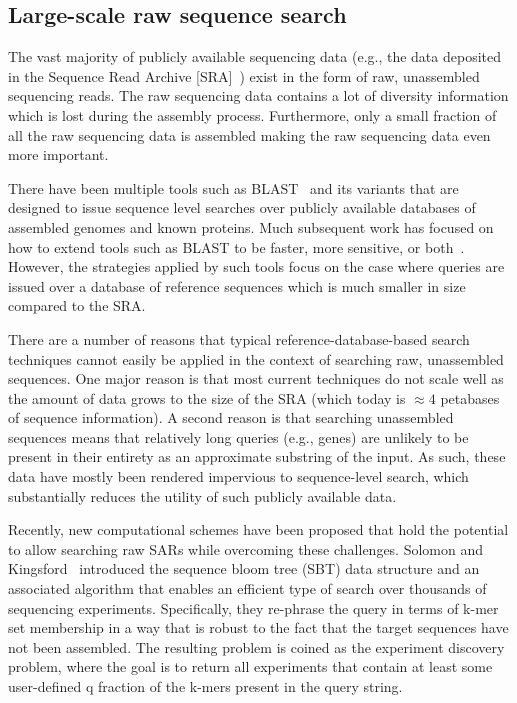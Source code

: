 

\subsection{Large-scale raw sequence search}

The vast majority of publicly available sequencing data (e.g., the data deposited in the Sequence Read Archive [SRA]~\cite{kodama2012sequence}) exist in the form of raw, unassembled sequencing reads. The raw sequencing data contains a lot of diversity information which is lost during the assembly process. Furthermore, only a small fraction of all the raw sequencing data is assembled making the raw sequencing data even more important.

There have been multiple tools such as BLAST~\cite{altschul1990basic} and its variants that are designed to issue sequence level searches over publicly available databases of assembled genomes and known proteins. Much subsequent work has focused on how to extend tools such as BLAST to be faster, more sensitive, or both~\cite{XXX}. However, the strategies applied by such tools focus on the case where queries are issued over a database of reference sequences which is much smaller in size compared to the SRA.

There are a number of reasons that typical reference-database-based search techniques cannot easily be applied in the context of searching raw, unassembled sequences. One major reason is that most current techniques do not scale well as the amount of data grows to the size of the SRA (which today is $\approx4$ petabases of sequence information). A second reason is that searching unassembled sequences means that relatively long queries (e.g., genes) are unlikely to be present in their entirety as an approximate substring of the input.
As such, these data have mostly been rendered impervious to sequence-level search, which substantially reduces the utility of such publicly available data.

Recently, new computational schemes have been proposed
that hold the potential to allow searching raw SARs while overcoming these challenges. Solomon and Kingsford~\cite{solomon2016fast} introduced the sequence bloom tree (SBT) data structure and an associated algorithm that enables an efficient type of search over thousands of sequencing experiments. Specifically, they re-phrase the query in terms of k-mer set membership in a way that is robust to the fact that the target sequences have not been assembled. The resulting problem is coined as the experiment discovery problem, where the goal is to return all experiments that contain at least some user-defined q fraction of the k-mers present in the query string.


